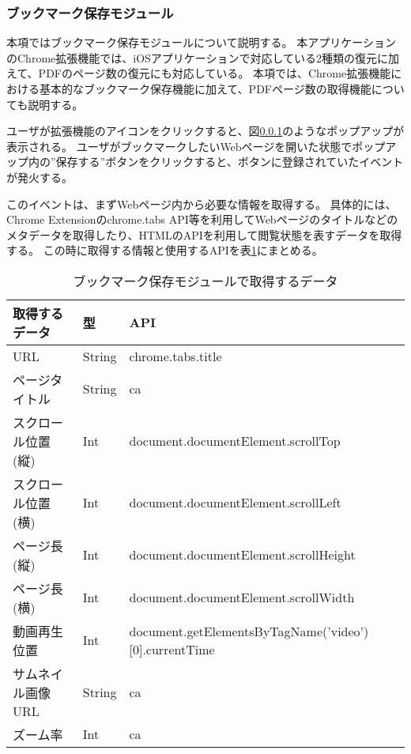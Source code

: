 \subsubsection{ブックマーク保存モジュール}
本項ではブックマーク保存モジュールについて説明する。
本アプリケーションのChrome拡張機能では、iOSアプリケーションで対応している2種類の復元に加えて、PDFのページ数の復元にも対応している。
本項では、Chrome拡張機能における基本的なブックマーク保存機能に加えて、PDFページ数の取得機能についても説明する。

ユーザが拡張機能のアイコンをクリックすると、図\ref{}のようなポップアップが表示される。
ユーザがブックマークしたいWebページを開いた状態でポップアップ内の”保存する”ボタンをクリックすると、ボタンに登録されていたイベントが発火する。

このイベントは、まずWebページ内から必要な情報を取得する。
具体的には、Chrome Extensionのchrome.tabs API等を利用してWebページのタイトルなどのメタデータを取得したり、HTMLのAPIを利用して閲覧状態を表すデータを取得する。
この時に取得する情報と使用するAPIを表\ref{tb:chrome-data-api}にまとめる。

\begin{table}[htbp]
  \label{tb:chrome-data-api}
  \caption{ブックマーク保存モジュールで取得するデータ}
  \begin{center}
    \begin{tabular}{|l|l|l|}
    \hline
    取得するデータ & 型 & API \\ \hline
    URL & String & chrome.tabs.title \\ \hline
    ページタイトル & String & ca \\ \hline
    スクロール位置(縦) & Int & document.documentElement.scrollTop \\ \hline
    スクロール位置(横) & Int & document.documentElement.scrollLeft \\ \hline
    ページ長(縦) & Int & document.documentElement.scrollHeight \\ \hline
    ページ長(横) & Int & document.documentElement.scrollWidth \\ \hline
    動画再生位置 & Int & document.getElementsByTagName('video')[0].currentTime \\ \hline
    サムネイル画像URL & String & ca \\ \hline
    ズーム率 & Int & ca \\ \hline
    \end{tabular}
  \end{center}
\end{table}

